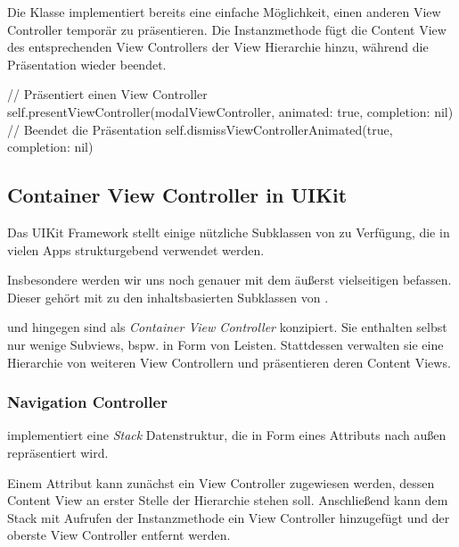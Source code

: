 \documentclass[parskip=half, final]{scrreprt}
\begin{document}
Die  Klasse implementiert bereits eine einfache Möglichkeit, einen anderen View Controller temporär zu präsentieren. Die Instanzmethode  fügt die Content View des entsprechenden View Controllers der View Hierarchie hinzu, während  die Präsentation wieder beendet.

\begin{swiftcode}
// Präsentiert einen View Controller
self.presentViewController(modalViewController, animated: true, completion: nil)
// Beendet die Präsentation
self.dismissViewControllerAnimated(true, completion: nil)
\end{swiftcode}

\subsection{Container View Controller in UIKit}\label{sec:vc_container_uikit}

Das UIKit Framework stellt einige nützliche Subklassen von  zu Verfügung, die in vielen Apps strukturgebend verwendet werden.

Insbesondere werden wir uns noch genauer mit dem äußerst vielseitigen  befassen. Dieser gehört mit  zu den inhaltsbasierten Subklassen von .

 und  hingegen sind als \emph{Container View Controller} konzipiert. Sie enthalten selbst nur wenige Subviews, bspw. in Form von Leisten. Stattdessen verwalten sie eine Hierarchie von weiteren View Controllern und präsentieren deren Content Views.

\subsubsection{Navigation Controller}

 implementiert eine \emph{Stack} Datenstruktur, die in Form eines Attributs  nach außen repräsentiert wird.

Einem Attribut  kann zunächst ein View Controller zugewiesen werden, dessen Content View an erster Stelle der Hierarchie stehen soll. Anschließend kann dem Stack mit Aufrufen der Instanzmethode  ein View Controller hinzugefügt und  der oberste View Controller entfernt werden.
\end{document}
